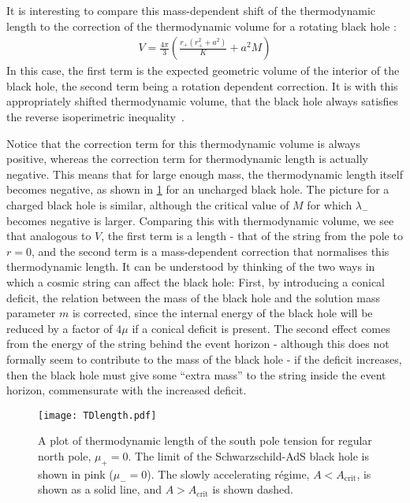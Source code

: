 \documentclass[
twoside,
openright,
frontopenright
]{dmathesis}
\begin{document}
It is interesting to compare this mass-dependent shift of the thermodynamic
length to the correction of the thermodynamic volume for a rotating black
hole \cite{Cvetic:2010jb,Dolan:2011jm}:
\begin{align}
V = \frac{4\pi}{3} \left( \frac{r_+(r_+^2+a^2)}{K} + a^2 M \right)
\end{align}
In this case, the first term is the expected geometric volume of the interior of
the black hole, the second term being a rotation dependent correction. It is
with this appropriately shifted thermodynamic volume, that the black hole always
satisfies the reverse isoperimetric inequality~\cite{Cvetic:2010jb}.

Notice that the correction term for this thermodynamic volume is always
positive, whereas the correction term for thermodynamic length is actually
negative.  This means that for large enough mass, the thermodynamic length
itself becomes negative, as shown in \cref{fig:TDlength} for an uncharged black
hole. The picture for a charged black hole is similar, although the critical
value of $M$ for which $\lambda_-$ becomes negative is larger. Comparing this
with thermodynamic volume, we see that analogous to $V$, the first term is a
length - that of the string from the pole to $r=0$, and the second term is a
mass-dependent correction that normalises this thermodynamic length.  It can be
understood by thinking of the two ways in which a cosmic string can affect the
black hole: First, by introducing a conical deficit, the relation between the
mass of the black hole and the solution mass parameter $m$ is corrected, since
the internal energy of the black hole will be reduced by a factor of $4\mu$ if a
conical deficit is present.  The second effect comes from the energy of the
string behind the event horizon - although this does not formally seem to
contribute to the mass of the black hole - if the deficit increases, then the
black hole must give some ``extra mass'' to the string inside the event horizon,
commensurate with the increased deficit.
\begin{figure}
  \centering
  \texttt{[image: TDlength.pdf]}
  \caption{\label{fig:TDlength}A plot of thermodynamic length of the south
    pole tension for regular north pole, $\mu_+=0$. The limit of the
    Schwarzschild-AdS black hole is shown in pink ($\mu_-=0$). The slowly
    accelerating r\'egime, $A<A_\mathrm{crit}$, is shown as a solid line, and
    $A>A_\mathrm{crit}$ is shown dashed.}
\end{figure}
\end{document}
